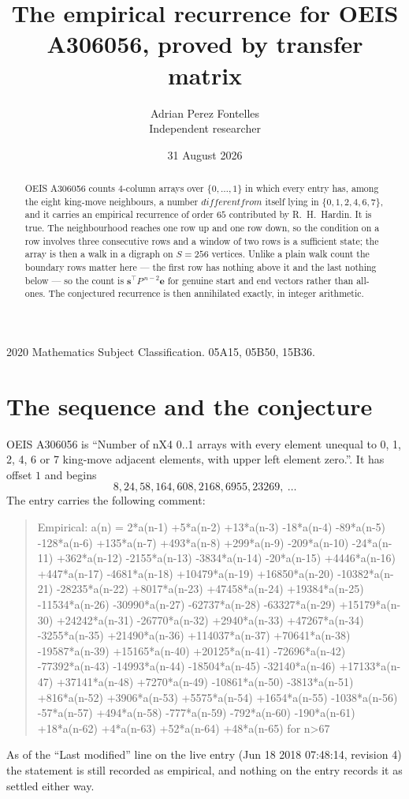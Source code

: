 \documentclass[11pt,a4paper]{article}
\title{The empirical recurrence for OEIS A306056, proved by transfer matrix}
\author{Adrian Perez Fontelles\\ \small Independent researcher}
\date{31 August 2026}
\theoremstyle{plain}
\theoremstyle{definition}
\begin{document}
\maketitle

\begin{abstract}
OEIS A306056 counts $4$-column arrays over $\{0,\dots,1\}$ in which every entry has,
among the eight king-move neighbours, a number $different from$ itself lying in $\{0,1,2,4,6,7\}$, and it carries an empirical
recurrence of order $65$ contributed by R.~H.~Hardin. It is true. The neighbourhood
reaches one row up and one row down, so the condition on a row involves three consecutive
rows and a window of two rows is a sufficient state; the array is then a walk in a digraph
on $S=256$ vertices. Unlike a plain walk count the boundary rows matter here --- the first
row has nothing above it and the last nothing below --- so the count is
$\mathbf{s}^{\!\top}P^{\,n-2}\mathbf{e}$ for genuine start and end vectors rather than
all-ones. The conjectured recurrence is then annihilated exactly, in integer arithmetic.
\end{abstract}

\noindent\small 2020 Mathematics Subject Classification. 05A15, 05B50, 15B36.\normalsize

\section{The sequence and the conjecture}

OEIS A306056 is ``Number of nX4 0..1 arrays with every element unequal to 0, 1, 2, 4, 6 or 7 king-move adjacent elements, with upper left element zero.''. It has offset
$1$ and begins
\[
8, 24, 58, 164, 608, 2168, 6955, 23269,\ \dots
\]
The entry carries the following comment:
\begin{quote}\small
Empirical: a(n) = 2*a(n-1) +5*a(n-2) +13*a(n-3) -18*a(n-4) -89*a(n-5) -128*a(n-6) +135*a(n-7) +493*a(n-8) +299*a(n-9) -209*a(n-10) -24*a(n-11) +362*a(n-12) -2155*a(n-13) -3834*a(n-14) -20*a(n-15) +4446*a(n-16) +447*a(n-17) -4681*a(n-18) +10479*a(n-19) +16850*a(n-20) -10382*a(n-21) -28235*a(n-22) +8017*a(n-23) +47458*a(n-24) +19384*a(n-25) -11534*a(n-26) -30990*a(n-27) -62737*a(n-28) -63327*a(n-29) +15179*a(n-30) +24242*a(n-31) -26770*a(n-32) +2940*a(n-33) +47267*a(n-34) -3255*a(n-35) +21490*a(n-36) +114037*a(n-37) +70641*a(n-38) -19587*a(n-39) +15165*a(n-40) +20125*a(n-41) -72696*a(n-42) -77392*a(n-43) -14993*a(n-44) -18504*a(n-45) -32140*a(n-46) +17133*a(n-47) +37141*a(n-48) +7270*a(n-49) -10861*a(n-50) -3813*a(n-51) +816*a(n-52) +3906*a(n-53) +5575*a(n-54) +1654*a(n-55) -1038*a(n-56) -57*a(n-57) +494*a(n-58) -777*a(n-59) -792*a(n-60) -190*a(n-61) +18*a(n-62) +4*a(n-63) +52*a(n-64) +48*a(n-65) for n>67
\end{quote}
As of the ``Last modified'' line on the live entry (Jun 18 2018 07:48:14, revision
4) the statement is still recorded as empirical, and nothing on the entry
records it as settled either way.
\end{document}
